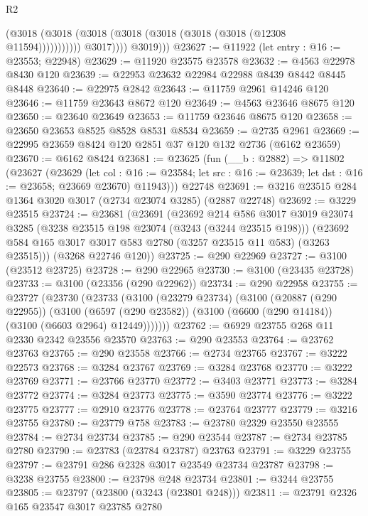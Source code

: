 \begin{lexlean}{R2}
\begin{coremodule}
                        (@3018 (@3018 (@3018 (@3018 (@3018 (@3018 (@3018 (@12308 @11594)))))))))))
                  @3017))))
          @3019)))
@23627 := @11922 (let entry : @16 := @23553; @22948)
@23629 := @11920 @23575 @23578
@23632 := @4563 @22978 @8430 @120
@23639 := @22953 @23632 @22984 @22988 @8439 @8442 @8445 @8448
@23640 := @22975 @2842
@23643 := @11759 @2961 @14246 @120
@23646 := @11759 @23643 @8672 @120
@23649 := @4563 @23646 @8675 @120
@23650 := @23640 @23649
@23653 := @11759 @23646 @8675 @120
@23658 := @23650 @23653 @8525 @8528 @8531 @8534
@23659 := @2735 @2961
@23669 := @22995 @23659 @8424 @120 @2851 @37 @120 @132 @2736 (@6162 @23659)
@23670 := @6162 @8424
@23681 := @23625
    (fun (__b : @2882) =>
    @11802
      (@23627
        (@23629
          (let col : @16 := @23584; let src : @16 := @23639; let dst : @16 := @23658; @23669 @23670)
          @11943)))
    @22748
@23691 := @3216 @23515 @284 @1364 @3020 @3017 (@2734 @23074 @3285) (@2887 @22748)
@23692 := @3229 @23515
@23724 := @23681
    (@23691
      (@23692
        @214
        @586
        @3017
        @3019
        @23074
        @3285
        (@3238 @23515 @198 @23074 (@3243 (@3244 @23515 @198)))
        (@23692 @584 @165 @3017 @3017 @583 @2780 (@3257 @23515 @11 @583) (@3263 @23515)))
      (@3268 @22746 @120))
@23725 := @290 @22969
@23727 := @3100 (@23512 @23725)
@23728 := @290 @22965
@23730 := @3100 (@23435 @23728)
@23733 := @3100 (@23356 (@290 @22962))
@23734 := @290 @22958
@23755 := @23727
    (@23730
      (@23733
        (@3100
          (@23279 @23734)
          (@3100
            (@20887 (@290 @22955))
            (@3100
              (@6597 (@290 @23582))
              (@3100 (@6600 (@290 @14184)) (@3100 (@6603 @2964) @12449)))))))
@23762 := @6929 @23755 @268 @11 @2330 @2342 @23556 @23570
@23763 := @290 @23553
@23764 := @23762 @23763
@23765 := @290 @23558
@23766 := @2734 @23765
@23767 := @3222 @22573
@23768 := @3284 @23767
@23769 := @3284 @23768
@23770 := @3222 @23769
@23771 := @23766 @23770
@23772 := @3403 @23771
@23773 := @3284 @23772
@23774 := @3284 @23773
@23775 := @3590 @23774
@23776 := @3222 @23775
@23777 := @2910 @23776
@23778 := @23764 @23777
@23779 := @3216 @23755
@23780 := @23779 @758
@23783 := @23780 @2329 @23550 @23555
@23784 := @2734 @23734
@23785 := @290 @23544
@23787 := @2734 @23785 @2780
@23790 := @23783 (@23784 @23787) @23763
@23791 := @3229 @23755
@23797 := @23791 @286 @2328 @3017 @23549 @23734 @23787
@23798 := @3238 @23755
@23800 := @23798 @248 @23734
@23801 := @3244 @23755
@23805 := @23797 (@23800 (@3243 (@23801 @248)))
@23811 := @23791 @2326 @165 @23547 @3017 @23785 @2780

\end{coremodule}
\end{lexlean}
